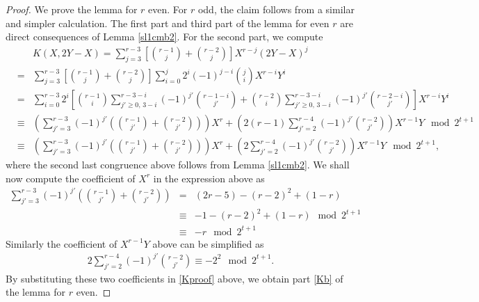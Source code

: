 \documentclass[11pt, reqno]{amsart}
\numberwithin{equation}{section}
\theoremstyle{definition}
\theoremstyle{remark}
\theoremstyle{definition}
\theoremstyle{remark}
\theoremstyle{remark}
\begin{document}
\begin{proof}
 We prove the lemma for $r$ even. For $r$ odd, the claim follows from a similar and simpler calculation. The first part and third part of the lemma for even $r$ are direct consequences of Lemma \ref{sl1cmb2}.
 For the second part, we compute
 \begin{eqnarray}
     && K(X,2Y-X) = \displaystyle\sum_{j=3}^{r-3}\left[{r-1 \choose j}+{r-2\choose j} \right]X^{r-j}(2Y-X)^j \nonumber\\
     &=& \displaystyle\sum_{j=3}^{r-3}\left[{r-1 \choose j}+{r-2\choose j} \right]\sum_{i=0}^{j}2^{i}(-1)^{j-i}{j \choose i}X^{r-i}Y^{i}\nonumber \\
     &=& \sum_{i=0}^{r-3}
     2^i\left[{r-1 \choose i}\sum_{j'\geq 0,\, 3-i}^{r-3-i}(-1)^{j'}{r-1-i\choose j'}
     +{r-2\choose i}\sum_{j'\geq 0,\, 3-i}^{r-3-i}(-1)^{j'}{r-2-i\choose j'}\right] X^{r-i}Y^{i}\nonumber\\
     &\equiv & 
     \left(\sum_{j'=3}^{r-3}(-1)^{j'}\left({r-1\choose j'}+{r-2\choose j'}\right)\right) X^{r}  +
     \left(2(r-1)\sum_{j'=2}^{r-4}(-1)^{j'}{r-2\choose j'}\right)X^{r-1}Y\mod 2^{t+1} \nonumber\\
     &\equiv & 
     \left(\sum_{j'=3}^{r-3}(-1)^{j'}\left({r-1\choose j'}+{r-2\choose j'}\right)\right) X^{r} +
     \left(2\sum_{j'=2}^{r-4}(-1)^{j'}{r-2\choose j'}\right)X^{r-1}Y\mod2^{t+1}, \label{Kproof}
\end{eqnarray}
where the second last congruence above follows from Lemma \ref{sl1cmb2}. We shall now compute the coefficient of $X^r$ in the expression above as
\begin{eqnarray*}
   \sum_{j'=3}^{r-3}(-1)^{j'}\left({r-1\choose j'}+{r-2\choose j'}\right) %
  & =& (2r-5)-(r-2)^2 +(1-r) \\
  &\equiv &-1-(r-2)^2+(1-r)\mod 2^{t+1}\\
   &\equiv & 
       -r \mod 2^{t+1}
   \end{eqnarray*}
   Similarly the coefficient of $X^{r-1}Y$ above can be simplified as
   \begin{eqnarray*}
   2\sum_{j'=2}^{r-4}(-1)^{j'}{r-2\choose j'}\equiv 
       -2^2 \mod 2^{t+1}. 
   \end{eqnarray*}
By substituting these two coefficients in \eqref{Kproof} above, we obtain part \eqref{Kb} of the lemma for $r$ even. 
\end{proof}
\end{document}
